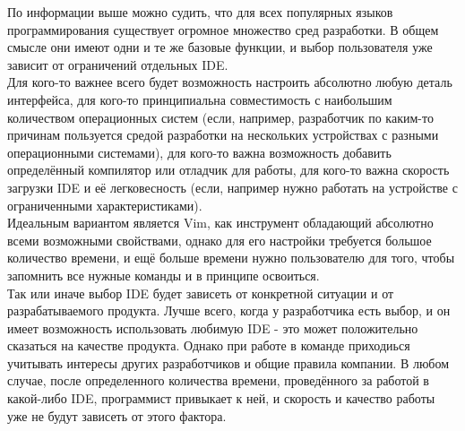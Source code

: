 \Conclusion %

По информации выше можно судить, что для всех популярных языков программирования существует 
огромное множество сред разработки. В общем смысле они имеют одни и те же базовые функции, и выбор 
пользователя уже зависит от ограничений отдельных IDE. \\

Для кого-то важнее всего будет возможность 
настроить абсолютно любую деталь интерфейса, для кого-то принципиальна совместимость с наибольшим 
количеством операционных систем (если, например, разработчик по каким-то причинам пользуется 
средой разработки на нескольких устройствах с разными операционными системами), для кого-то важна 
возможность добавить определённый компилятор или отладчик для работы, для кого-то важна скорость 
загрузки IDE и её легковесность (если, например нужно работать на устройстве с ограниченными 
характеристиками).\\

Идеальным вариантом является Vim, как инструмент обладающий абсолютно всеми возможными свойствами, 
однако для его настройки требуется большое количество времени, и ещё больше времени нужно 
пользователю для того, чтобы запомнить все нужные команды и в принципе освоиться.\\

Так или иначе выбор IDE будет зависеть от конкретной ситуации и от разрабатываемого продукта. Лучше
всего, когда у разработчика есть выбор, и он имеет возможность использовать любимую IDE - это может 
положительно сказаться на качестве продукта. Однако при работе в команде приходиься учитывать 
интересы других разработчиков и общие правила компании. В любом случае, после определенного 
количества времени, проведённого за работой в какой-либо IDE, программист привыкает к ней, и 
скорость и качество работы уже не будут зависеть от этого фактора.\\
